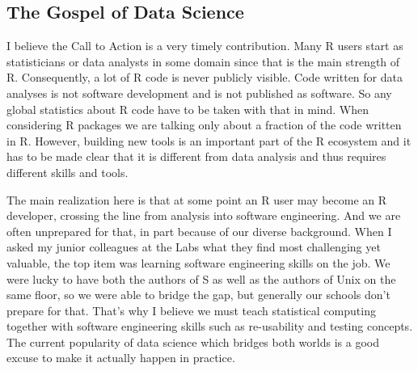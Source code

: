 \hypertarget{the-gospel-of-data-science}{%
\subsection{The Gospel of Data
Science}\label{the-gospel-of-data-science}}

I believe the Call to Action is a very timely contribution. Many R users
start as statisticians or data analysts in some domain since that is the
main strength of R. Consequently, a lot of R code is never publicly
visible. Code written for data analyses is not software development and
is not published as software. So any global statistics about R code have
to be taken with that in mind. When considering R packages we are
talking only about a fraction of the code written in R. However,
building new tools is an important part of the R ecosystem and it has to
be made clear that it is different from data analysis and thus requires
different skills and tools.

The main realization here is that at some point an R user may become an
R developer, crossing the line from analysis into software engineering.
And we are often unprepared for that, in part because of our diverse
background. When I asked my junior colleagues at the Labs what they find
most challenging yet valuable, the top item was learning software
engineering skills on the job. We were lucky to have both the authors of
S as well as the authors of Unix on the same floor, so we were able to
bridge the gap, but generally our schools don't prepare for that. That's
why I believe we must teach statistical computing together with software
engineering skills such as re-usability and testing concepts. The
current popularity of data science which bridges both worlds is a good
excuse to make it actually happen in practice.



\address{%
Simon Urbanek\\
University of Auckland\\%
Department of Statistics\\ Auckland, New Zealand\\
%
%
%
\href{mailto:urbanek@R-project.org}{\nolinkurl{urbanek@R-project.org}}%
}
